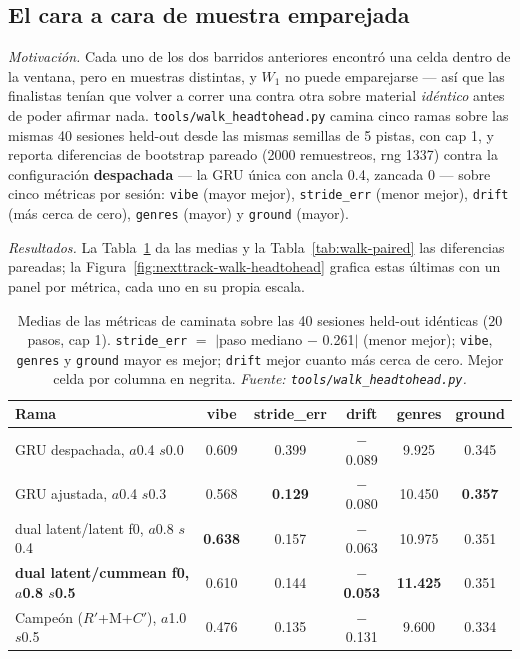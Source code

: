 \documentclass[11pt]{article}
\newcommand{\best}[1]{\textbf{#1}}
\newcommand{\Rp}{\ensuremath{R'}}
\newcommand{\Cp}{\ensuremath{C'}}
\begin{document}
\subsection{El cara a cara de muestra emparejada}
\label{sec:walk-h2h}
\emph{Motivación.} Cada uno de los dos barridos anteriores encontró una celda
dentro de la ventana, pero en muestras distintas, y $W_1$ no puede emparejarse
--- así que las finalistas tenían que volver a correr una contra otra sobre
material \emph{idéntico} antes de poder afirmar nada.
\texttt{tools/walk\_headtohead.py} camina cinco ramas sobre las mismas \num{40}
sesiones held-out desde las mismas semillas de 5 pistas, con cap 1, y reporta
diferencias de bootstrap pareado (\num{2000} remuestreos, rng \num{1337}) contra
la configuración \textbf{despachada} --- la GRU única con ancla \num{0.4},
zancada \num{0} --- sobre cinco métricas por sesión: \texttt{vibe} (mayor
mejor), \texttt{stride\_err} (menor mejor), \texttt{drift} (más cerca de cero),
\texttt{genres} (mayor) y \texttt{ground} (mayor).

\emph{Resultados.} La Tabla~\ref{tab:walk-means} da las medias y la
Tabla~\ref{tab:walk-paired} las diferencias pareadas; la
Figura~\ref{fig:nexttrack-walk-headtohead} grafica estas últimas con un panel
por métrica, cada uno en su propia escala.

\begin{table}[ht]
  \centering
  \caption{Medias de las métricas de caminata sobre las \num{40} sesiones
  held-out idénticas ($\num{20}$ pasos, cap 1). \texttt{stride\_err} $=$
  $|$paso mediano $-$ \num{0.261}$|$ (menor mejor); \texttt{vibe},
  \texttt{genres} y \texttt{ground} mayor es mejor; \texttt{drift} mejor cuanto
  más cerca de cero. Mejor celda por columna en negrita.
  \emph{Fuente: \texttt{tools/walk\_headtohead.py}.}}
  \label{tab:walk-means}
  {\footnotesize\setlength{\tabcolsep}{6pt}\begin{tabular}{lccccc}
    \toprule
    Rama & vibe & stride\_err & drift & genres & ground \\
    \midrule
    GRU despachada, $a$\num{0.4} $s$\num{0.0} & 0.609 & 0.399 & $-$0.089 & 9.925 & 0.345 \\
    GRU ajustada, $a$\num{0.4} $s$\num{0.3} & 0.568 & \best{0.129} & $-$0.080 & 10.450 & \best{0.357} \\
    dual latent/latent f0, $a$\num{0.8} $s$\num{0.4} & \best{0.638} & 0.157 & $-$0.063 & 10.975 & 0.351 \\
    \best{dual latent/cummean f0, $a$\num{0.8} $s$\num{0.5}} & 0.610 & 0.144 & \best{$-$0.053} & \best{11.425} & 0.351 \\
    Campeón (\Rp+M+\Cp), $a$\num{1.0} $s$\num{0.5} & 0.476 & 0.135 & $-$0.131 & 9.600 & 0.334 \\
    \bottomrule
  \end{tabular}}
\end{table}
\end{document}

